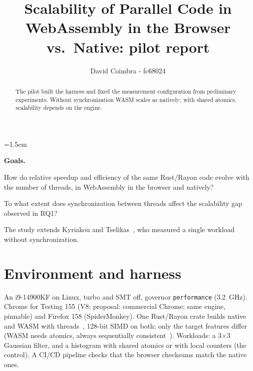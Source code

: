 \documentclass[sigplan]{acmart}
\begin{document}
\raggedbottom
\emergencystretch=1.5em

\title{Scalability of Parallel Code in WebAssembly in the Browser vs.\ Native: pilot report}

\author{David Coimbra - fc68024}

\begin{abstract}
The pilot built the harness and fixed the measurement configuration
from preliminary experiments. Without
synchronization WASM scales as natively; with shared atomics, scalability
depends on the engine.
\end{abstract}


\pagestyle{plain}

\maketitle

\noindent\textbf{Goals.}
\begin{description}[nosep]
  \item[RQ1] How do relative speedup and efficiency of the same Rust/Rayon
  code evolve with the number of threads, in WebAssembly in the browser and
  natively?
  \item[RQ2] To what extent does synchronization between threads affect
  the scalability gap observed in RQ1?
\end{description}
\noindent The study extends Kyriakou and Tselikas~\cite{kyriakou2022}, who
measured a single workload without synchronization.

\section{Environment and harness}

\noindent An i9-14900KF on Linux, turbo and SMT off, governor
\texttt{performance} (3.2~GHz). Chrome for
Testing 155 (V8; proposal: commercial Chrome; same engine, pinnable) and
Firefox 158 (SpiderMonkey).
One Rust/Rayon crate builds native and WASM with threads~\cite{haas2017},
128-bit SIMD on both; only the target features differ (WASM needs atomics,
always sequentially consistent~\cite{sanchez2025}). Workloads: a 3$\times$3 Gaussian
filter, and a histogram with shared atomics or with local counters (the
control). A CI/CD pipeline checks that the browser
checksums match the native ones.
\end{document}
